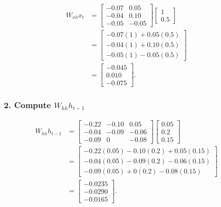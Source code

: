 \documentclass[11pt]{article}
\begin{document}
\[
\begin{aligned}
    W_{xh}x_t
    &=
    \begin{bmatrix}
        -0.07 & 0.05 \\
        -0.04 & 0.10 \\
        -0.05 & -0.05
    \end{bmatrix}
    \begin{bmatrix}1 \\ 0.5\end{bmatrix} \\
    &=
    \begin{bmatrix}
        -0.07(1)+0.05(0.5) \\
        -0.04(1)+0.10(0.5) \\
        -0.05(1)-0.05(0.5)
    \end{bmatrix} \\
    &=
    \begin{bmatrix}
        -0.045 \\
        0.010 \\
        -0.075
    \end{bmatrix}.
\end{aligned}
\]

\subsubsection*{2. Compute \(W_{hh}h_{t-1}\)}

\[
\begin{aligned}
    W_{hh}h_{t-1}
    &=
    \begin{bmatrix}
        -0.22 & -0.10 & 0.05 \\
        -0.04 & -0.09 & -0.06 \\
        -0.09 & 0 & -0.08
    \end{bmatrix}
    \begin{bmatrix}
        0.05 \\ 0.2 \\ 0.15
    \end{bmatrix} \\
    &=
    \begin{bmatrix}
        -0.22(0.05)-0.10(0.2)+0.05(0.15) \\
        -0.04(0.05)-0.09(0.2)-0.06(0.15) \\
        -0.09(0.05)+0(0.2)-0.08(0.15)
    \end{bmatrix} \\
    &=
    \begin{bmatrix}
        -0.0235 \\
        -0.0290 \\
        -0.0165
    \end{bmatrix}.
\end{aligned}
\]
\end{document}
